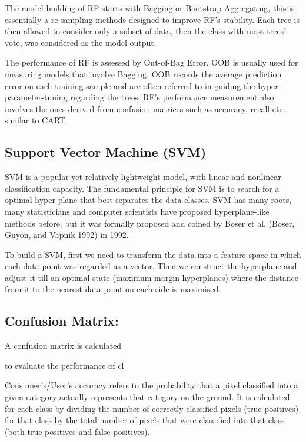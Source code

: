 \documentclass[
  letterpaper,
  DIV=11,
  numbers=noendperiod]{scrreprt}
\begin{document}
The model building of RF starts with Bagging or
\href{https://en.wikipedia.org/wiki/Bootstrap_aggregating}{Bootstrap
Aggregating}, this is essentially a re-sampling methods designed to
improve RF's stability. Each tree is then allowed to consider only a
subset of data, then the class with most trees' vote, was considered as
the model output.

The performance of RF is assessed by Out-of-Bag Error. OOB is usually
used for measuring models that involve Bagging. OOB records the average
prediction error on each training sample and are often referred to in
guiding the hyper-parameter-tuning regarding the trees. RF's performance
measurement also involves the ones derived from confusion matrices such
as accuracy, recall etc. similar to CART.

\hypertarget{support-vector-machine-svm}{%
\subsection*{Support Vector Machine
(SVM)}\label{support-vector-machine-svm}}

SVM is a popular yet relatively lightweight model, with linear and
nonlinear classification capacity. The fundamental principle for SVM is
to search for a optimal hyper plane that best separates the data
classes. SVM has many roots, many statisticians and computer scientists
have proposed hyperplane-like methods before, but it was formally
proposed and coined by Boser et al. (Boser, Guyon, and Vapnik 1992) in
1992.

To build a SVM, first we need to transform the data into a feature space
in which each data point was regarded as a vector. Then we construct the
hyperplane and adjust it till an optimal state (maximum margin
hyperplanes) where the distance from it to the nearest data point on
each side is maximised.

\hypertarget{confusion-matrix}{%
\subsection*{Confusion Matrix:}\label{confusion-matrix}}

A confusion matrix is calculated

to evaluate the performance of cl

Consumer's/User's accuracy refers to the probability that a pixel
classified into a given category actually represents that category on
the ground. It is calculated for each class by dividing the number of
correctly classified pixels (true positives) for that class by the total
number of pixels that were classified into that class (both true
positives and false positives).
\end{document}

